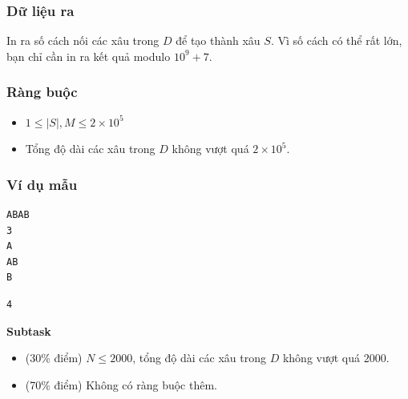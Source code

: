 \subsubsection*{Dữ liệu ra}
In ra số cách nối các xâu trong $D$ để tạo thành xâu $S$. Vì số cách có thể rất lớn, bạn chỉ cần in ra kết quả modulo $10^9 + 7$.

\subsubsection*{Ràng buộc}
\begin{itemize}
  \item $1 \le |S|, M \le 2\times 10^5$
  \item Tổng độ dài các xâu trong $D$ không vượt quá $2\times 10^5$.
\end{itemize}

\subsubsection*{Ví dụ mẫu}

\begin{tcolorbox}[title=Input]
\begin{verbatim}
ABAB
3
A
AB
B
\end{verbatim}
\end{tcolorbox}

\begin{tcolorbox}[title=Output]
\begin{verbatim}
4
\end{verbatim}
\end{tcolorbox}

\textbf{Subtask}

\begin{itemize}
  \item (30\% điểm) $N \le 2000$, tổng độ dài các xâu trong $D$ không vượt quá $2000$.
  \item (70\% điểm) Không có ràng buộc thêm.
\end{itemize}